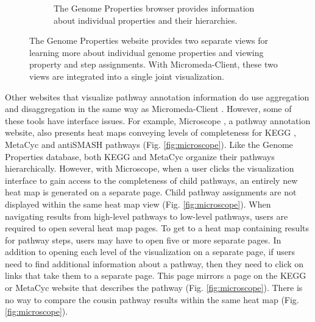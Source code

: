 \begin{figure}
\begin{subfigure}[b]{0.46\textwidth}
         \caption{The Genome Properties browser provides information about individual properties and their hierarchies.}
         \label{fig:property-browser}
     \end{subfigure}
     \caption{The Genome Properties website provides two separate views for learning more about individual genome properties and viewing property and step assignments. With Micromeda-Client, these two views are integrated into a single joint visualization.}
     \label{fig:genome-properties-interface}
\end{figure}

Other websites that visualize pathway annotation information do use aggregation and disaggregation in the same way as Micromeda-Client \cite{vallenet2016microscope,darzi2019functree2}. However, some of these tools have interface issues. For example, Microscope \cite{vallenet2016microscope}, a pathway annotation website, also presents heat maps conveying levels of completeness for KEGG \cite{kanehisa2000kegg}, MetaCyc \cite{karp2002metacyc} and antiSMASH \cite{blin2019antismash} pathways (Fig. \ref{fig:microscope}). Like the Genome Properties database, both KEGG and MetaCyc organize their pathways hierarchically. However, with Microscope, when a user clicks the visualization interface to gain access to the completeness of child pathways, an entirely new heat map is generated on a separate page. Child pathway assignments are not displayed within the same heat map view (Fig. \ref{fig:microscope}). When navigating results from high-level pathways to low-level pathways, users are required to open several heat map pages. To get to a heat map containing results for pathway steps, users may have to open five or more separate pages. In addition to opening each level of the visualization on a separate page, if users need to find additional information about a pathway, then they need to click on links that take them to a separate page. This page mirrors a page on the KEGG or MetaCyc website that describes the pathway (Fig. \ref{fig:microscope}). There is no way to compare the cousin pathway results within the same heat map (Fig. \ref{fig:microscope}).

